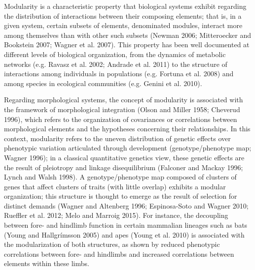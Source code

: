 \documentclass[12pt,]{article}
\begin{document}
Modularity is a characteristic property that biological systems exhibit
regarding the distribution of interactions between their composing
elements; that is, in a given system, certain subsets of elements,
denominated modules, interact more among themselves than with other such
subsets (Newman 2006; Mitteroecker and Bookstein 2007; Wagner et al.
2007). This property has been well documented at different levels of
biological organization, from the dynamics of metabolic networks (e.g.
Ravasz et al. 2002; Andrade et al. 2011) to the structure of
interactions among individuals in populations (e.g. Fortuna et al. 2008)
and among species in ecological communities (e.g. Genini et al. 2010).

Regarding morphological systems, the concept of modularity is associated
with the framework of morphological integration (Olson and Miller 1958;
Cheverud 1996), which refers to the organization of covariances or
correlations between morphological elements and the hypotheses
concerning their relationships. In this context, modularity refers to
the uneven distribution of genetic effects over phenotypic variation
articulated through development (genotype/phenotype map; Wagner 1996);
in a classical quantitative genetics view, these genetic effects are the
result of pleiotropy and linkage disequilibrium (Falconer and Mackay
1996; Lynch and Walsh 1998). A genotype/phenotype map composed of
clusters of genes that affect clusters of traits (with little overlap)
exhibits a modular organization; this structure is thought to emerge as
the result of selection for distinct demands (Wagner and Altenberg 1996;
Espinosa-Soto and Wagner 2010; Rueffler et al. 2012; Melo and Marroig
2015). For instance, the decoupling between fore- and hindlimb function
in certain mammalian lineages such as bats (Young and Hallgrímsson 2005)
and apes (Young et al. 2010) is associated with the modularization of
both structures, as shown by reduced phenotypic correlations between
fore- and hindlimbs and increased correlations between elements within
these limbs.
\end{document}
